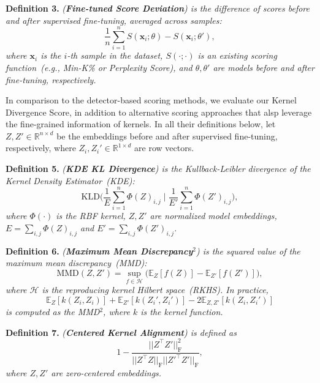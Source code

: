 
\noindent\textbf{Definition 3.} \textit{(\textbf{Fine-tuned Score Deviation}) is the difference of scores before and after supervised fine-tuning, averaged across samples:}
\begin{equation}
    \frac{1}{n}\sum_{i=1}^n S(\mathbf{x}_i; \theta) - S(\mathbf{x}_i; \theta'),
\end{equation}
\textit{where $\mathbf{x}_i$ is the $i$-th sample in the dataset, $S(\cdot;\cdot)$ is an existing scoring function~(e.g., Min-K\% or Perplexity Score), and $\theta, \theta'$ are models before and after fine-tuning, respectively.}~\cite{zhang2024fine}



In comparison to the detector-based scoring methods, we evaluate our Kernel Divergence Score, in addition to alternative scoring approaches that alsp leverage the fine-grained information of kernels.
In all their definitions below, let $Z, Z' \in \mathbb{R}^{n \times d}$ be the embeddings before and after supervised fine-tuning, respectively, where $Z_i, Z_i' \in \mathbb{R}^{1 \times d}$ are row vectors.

\noindent\textbf{Definition 5.} \textit{(\textbf{KDE KL Divergence}) is the Kullback-Leibler divergence of the Kernel Density Estimator~(KDE):}
\begin{equation}
    \text{KLD}\bigg(\frac{1}{E}\sum_{i=1}^n\Phi(Z)_{i,j} \; \bigg\vert \; \frac{1}{E'}\sum_{i=1}^n\Phi(Z')_{i,j}\bigg),
\end{equation}
\textit{where $\Phi(\cdot)$ is the RBF kernel, $Z, Z'$ are normalized model embeddings, $E = \sum_{i,j} \Phi(Z)_{i,j}$ and $E' = \sum_{i,j} \Phi(Z')_{i,j}$.}

\noindent\textbf{Definition 6.} \textit{(\textbf{Maximum Mean Discrepancy$^2$}) is the squared value of the maximum mean discrepancy~(MMD):}
\begin{equation}
    \text{MMD}(Z, Z') = \sup_{f \in \mathcal{H}}\bigg(\mathbb{E}_{Z}[f(Z)] - \mathbb{E}_{Z'}[f(Z')]\bigg),
\end{equation}
\textit{where $\mathcal{H}$ is the reproducing kernel Hilbert space~(RKHS). In practice, }
\begin{equation}
    \mathbb{E}_Z[k(Z_i, Z_i)] + \mathbb{E}_{Z'}[k(Z_i', Z_i')] - 2 \mathbb{E}_{Z,Z'}[k(Z_i, Z_i')]
\end{equation}
\textit{is computed as the MMD$^2$, where $k$ is the kernel function.}~\cite{gretton2012kernel}


\noindent\textbf{Definition 7.} \textit{(\textbf{Centered Kernel Alignment}) is defined as}
\begin{equation}
    1 - \frac{||Z^\top Z'||_\text{F}^2}{||Z^\top Z||_\text{F} ||Z'^\top Z'||_\text{F}},
\end{equation}
\textit{where $Z, Z'$ are zero-centered embeddings.}~\cite{kornblith2019similarity}




